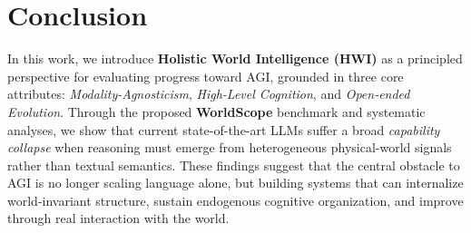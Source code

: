 \section{Conclusion}
\label{sec:conclusion}

In this work, we introduce \textbf{Holistic World Intelligence (HWI)} as a principled perspective for evaluating progress toward AGI, grounded in three core attributes: 
\emph{Modality-Agnosticism}, \emph{High-Level Cognition}, and \emph{Open-ended Evolution}. 
Through the proposed \textbf{WorldScope} benchmark and systematic analyses, we show that current state-of-the-art LLMs suffer a broad \emph{capability collapse} when reasoning must emerge from heterogeneous physical-world signals rather than textual semantics. 
These findings suggest that the central obstacle to AGI is no longer scaling language alone, but building systems that can internalize world-invariant structure, sustain endogenous cognitive organization, and improve through real interaction with the world.